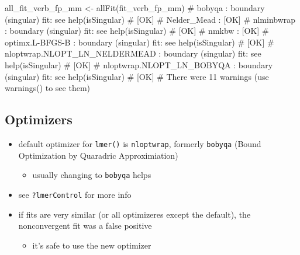 \documentclass[
  letterpaper,
  DIV=11,
  numbers=noendperiod]{scrartcl}
\newenvironment{Shaded}{\begin{snugshade}}{\end{snugshade}}
\newcommand{\CommentTok}[1]{\textcolor[rgb]{0.37,0.37,0.37}{#1}}
\newcommand{\FunctionTok}[1]{\textcolor[rgb]{0.28,0.35,0.67}{#1}}
\newcommand{\NormalTok}[1]{\textcolor[rgb]{0.00,0.23,0.31}{#1}}
\newcommand{\OtherTok}[1]{\textcolor[rgb]{0.00,0.23,0.31}{#1}}
\newcommand{\SpecialCharTok}[1]{\textcolor[rgb]{0.37,0.37,0.37}{#1}}
\providecommand{\tightlist}{%
  \setlength{\itemsep}{0pt}\setlength{\parskip}{0pt}}\usepackage{longtable,booktabs,array}
\begin{document}
\begin{Shaded}
\begin{Highlighting}[]
\NormalTok{all\_fit\_verb\_fp\_mm }\OtherTok{\textless{}{-}} \FunctionTok{allFit}\NormalTok{(fit\_verb\_fp\_mm)}
\CommentTok{\# bobyqa : boundary (singular) fit: see help(\textquotesingle{}isSingular\textquotesingle{})}
\CommentTok{\# [OK]}
\CommentTok{\# Nelder\_Mead : [OK]}
\CommentTok{\# nlminbwrap : boundary (singular) fit: see help(\textquotesingle{}isSingular\textquotesingle{})}
\CommentTok{\# [OK]}
\CommentTok{\# nmkbw : [OK]}
\CommentTok{\# optimx.L{-}BFGS{-}B : boundary (singular) fit: see help(\textquotesingle{}isSingular\textquotesingle{})}
\CommentTok{\# [OK]}
\CommentTok{\# nloptwrap.NLOPT\_LN\_NELDERMEAD : boundary (singular) fit: see help(\textquotesingle{}isSingular\textquotesingle{})}
\CommentTok{\# [OK]}
\CommentTok{\# nloptwrap.NLOPT\_LN\_BOBYQA : boundary (singular) fit: see help(\textquotesingle{}isSingular\textquotesingle{})}
\CommentTok{\# [OK]}
\CommentTok{\# There were 11 warnings (use warnings() to see them)}
\end{Highlighting}
\end{Shaded}

\hypertarget{optimizers}{%
\subsection{Optimizers}\label{optimizers}}

\begin{itemize}
\item
  default optimizer for \texttt{lmer()} is \texttt{nloptwrap}, formerly
  \texttt{bobyqa} (Bound Optimization by Quaradric Approximiation)

  \begin{itemize}
  \tightlist
  \item
    usually changing to \texttt{bobyqa} helps
  \end{itemize}
\item
  see \texttt{?lmerControl} for more info
\item
  if fits are very similar (or all optimizeres except the default), the
  nonconvergent fit was a false positive

  \begin{itemize}
  \tightlist
  \item
    it's safe to use the new optimizer
  \end{itemize}
\end{itemize}

\begin{Shaded}
\end{Shaded}
\end{document}
